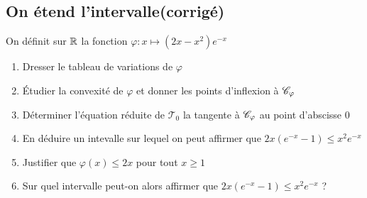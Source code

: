 \documentclass[oneside,12pt]{book}          %
\begin{document}
\subsection{On étend l'intervalle\quad\small{(corrigé)}}
On définit sur ${\mathbb R}$ la fonction $\varphi:x\mapsto(2x-x^2)e^{-x}$
\begin{enumerate}
	\item Dresser le tableau de variations de $\varphi$
	\item Étudier la convexité de $\varphi$ et donner les points d'inflexion à ${\mathscr{C}}_\varphi$
	\item Déterminer l'équation réduite de $\mathcal{T}_0$ la tangente à ${\mathscr{C}}_\varphi$ au point d'abscisse 0
	\item En déduire un intevalle sur lequel on peut affirmer que $2x(e^{-x}-1)\leq x^2e^{-x}$
	\item Justifier que $\varphi(x)\leq2x$ pour tout $x\geq1$
	\item Sur quel intervalle peut-on alors affirmer que $2x(e^{-x}-1)\leq x^2e^{-x}$ ?
\end{enumerate}
\end{document}
